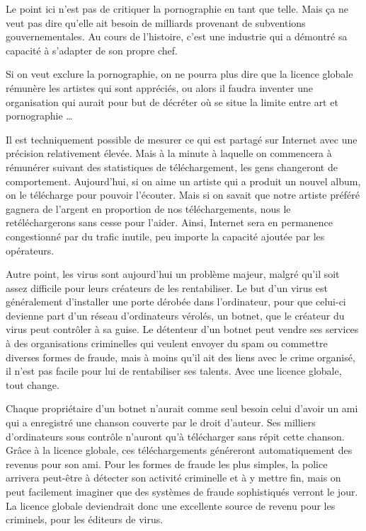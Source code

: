 Le point ici n'est pas de critiquer la pornographie en tant que telle.
Mais ça ne veut pas dire qu'elle ait besoin de milliards provenant de subventions gouvernementales.
Au cours de l'histoire, c'est une industrie qui a démontré sa capacité à s'adapter de son propre chef.

Si on veut exclure la pornographie, on ne pourra plus dire que la licence globale rémunère les artistes qui sont appréciés, ou alors il faudra inventer une organisation qui aurait pour but de décréter où se situe la limite entre art et pornographie \dots{}

Il est techniquement possible de mesurer ce qui est partagé sur Internet avec une précision relativement élevée.
Mais à la minute à laquelle on commencera à rémunérer suivant des statistiques de téléchargement, les gens changeront de comportement.
Aujourd'hui, si on aime un artiste qui a produit un nouvel album, on le télécharge pour pouvoir l'écouter.
Mais si on savait que notre artiste préféré gagnera de l'argent en proportion de nos téléchargements, nous le retéléchargerons sans cesse pour l'aider.
Ainsi, Internet sera en permanence congestionné par du trafic inutile, peu importe la capacité ajoutée par les opérateurs.

Autre point, les virus sont aujourd'hui un problème majeur, malgré qu'il soit assez difficile pour leurs créateurs de les rentabiliser.
Le but d'un virus est généralement d'installer une porte dérobée dans l'ordinateur, pour que celui-ci devienne part d'un réseau d'ordinateurs vérolés, un botnet, que le créateur du virus peut contrôler à sa guise.
Le détenteur d'un botnet peut vendre ses services à des organisations criminelles qui veulent envoyer du spam ou commettre diverses formes de fraude, mais à moins qu'il ait des liens avec le crime organisé, il n'est pas facile pour lui de rentabiliser ses talents.
Avec une licence globale, tout change.

Chaque propriétaire d'un botnet n'aurait comme seul besoin celui d'avoir un ami qui a enregistré une chanson couverte par le droit d'auteur.
Ses milliers d'ordinateurs sous contrôle n'auront qu'à télécharger sans répit cette chanson.
Grâce à la licence globale, ces téléchargements généreront automatiquement des revenus pour son ami.
Pour les formes de fraude les plus simples, la police arrivera peut-être à détecter son activité criminelle et à y mettre fin, mais on peut facilement imaginer que des systèmes de fraude sophistiqués verront le jour.
La licence globale deviendrait donc une excellente source de revenu pour les criminels, pour les éditeurs de virus.

